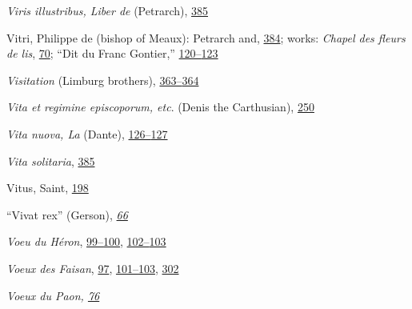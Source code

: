 \emph{Viris illustribus, Liber de} (Petrarch),
\protect\hyperlink{22_Chapter_Fourteen__THE_COMING_OF.xhtmlux5cux23page_385}{385}

Vitri, Philippe de (bishop of Meaux): Petrarch and,
\protect\hyperlink{22_Chapter_Fourteen__THE_COMING_OF.xhtmlux5cux23page_384}{384};
works: \emph{Chapel des fleurs de lis},
\protect\hyperlink{10_Chapter_Three__THE_HEROIC_DREAM.xhtmlux5cux23page_70}{70};
``Dit du Franc Gontier,''
\protect\hyperlink{10_Chapter_Three__THE_HEROIC_DREAM.xhtmlux5cux23page_120}{120--}\protect\hyperlink{10_Chapter_Three__THE_HEROIC_DREAM.xhtmlux5cux23page_123}{123}

\emph{Visitation} (Limburg brothers),
\protect\hyperlink{21_Chapter_Thirteen__IMAGE_AND_WORD.xhtmlux5cux23page_363}{363--}\protect\hyperlink{21_Chapter_Thirteen__IMAGE_AND_WORD.xhtmlux5cux23page_364}{364}

\emph{Vita et regimine episcoporum, etc}. (Denis the Carthusian),
\protect\hyperlink{17_Chapter_Ten__THE_FAILURE_OF_IMAG.xhtmlux5cux23page_250}{250}

\emph{Vita nuova, La} (Dante),
\protect\hyperlink{11_Chapter_Four__THE_FORMS_OF_LOVE.xhtmlux5cux23page_126}{126--}\protect\hyperlink{11_Chapter_Four__THE_FORMS_OF_LOVE.xhtmlux5cux23page_127}{127}

\emph{Vita solitaria},
\protect\hyperlink{22_Chapter_Fourteen__THE_COMING_OF.xhtmlux5cux23page_385}{385}

Vitus, Saint,
\protect\hyperlink{13_Chapter_Six__THE_DEPICTION_OF_TH.xhtmlux5cux23page_198}{198}

``Vivat rex'' (Gerson),
\emph{\protect\hyperlink{10_Chapter_Three__THE_HEROIC_DREAM.xhtmlux5cux23page_66}{66}}

\emph{Voeu du Héron},
\protect\hyperlink{10_Chapter_Three__THE_HEROIC_DREAM.xhtmlux5cux23page_99}{99--}\protect\hyperlink{10_Chapter_Three__THE_HEROIC_DREAM.xhtmlux5cux23page_100}{100},
\protect\hyperlink{10_Chapter_Three__THE_HEROIC_DREAM.xhtmlux5cux23page_102}{102--}\protect\hyperlink{10_Chapter_Three__THE_HEROIC_DREAM.xhtmlux5cux23page_103}{103}

\emph{Voeux des Faisan},
\protect\hyperlink{10_Chapter_Three__THE_HEROIC_DREAM.xhtmlux5cux23page_97}{97},
\protect\hyperlink{10_Chapter_Three__THE_HEROIC_DREAM.xhtmlux5cux23page_101}{101--}\protect\hyperlink{10_Chapter_Three__THE_HEROIC_DREAM.xhtmlux5cux23page_103}{103},
\protect\hyperlink{20_ILLUSTRATIONS_FOLLOW_PAGE.xhtmlux5cux23page_302}{302}

\emph{Voeux du Paon,
\protect\hyperlink{10_Chapter_Three__THE_HEROIC_DREAM.xhtmlux5cux23page_76}{76}}

